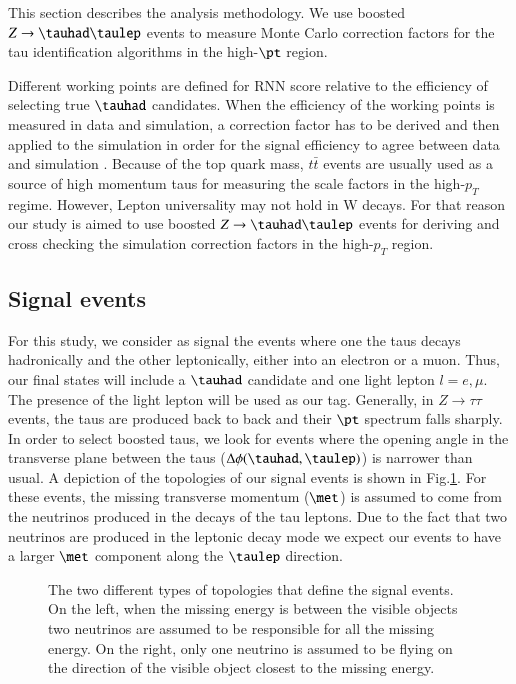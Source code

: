 This section describes the analysis methodology. We use boosted $Z\to\tauhad\taulep$ events to measure Monte Carlo correction factors for the tau identification algorithms in the high-$\pt$ region.

Different working points are defined for RNN score relative to the efficiency of selecting true $\tauhad$ candidates. When the efficiency of the working points is measured in data and simulation, a correction factor has to be derived and then applied to the simulation in order for the signal efficiency to agree between data and simulation \cite{ATLAS:2017mpa}. Because of the top quark mass, $t\bar{t}$ events are usually used as a source of high momentum taus for measuring the scale factors in the high-$p_T$ regime. However, Lepton universality may not hold in W decays. For that reason our study is aimed to use boosted $Z\to\tauhad\taulep$ events for deriving and cross checking the simulation correction factors in the high-$p_T$ region.   
\subsection{Signal events}\label{signalevents}
For this study, we consider as signal the events where one the taus decays hadronically and the other leptonically, either into an electron or a muon. Thus, our final states will include a $\tauhad$ candidate and one light lepton $l=e,\mu$. The presence of the light lepton will be used as our tag. 
Generally, in $Z\to\tau\tau$ events, the taus are produced back to back and their $\pt$ spectrum falls sharply. In order to select boosted taus, we look for events where the opening angle in the transverse plane between the taus ($\Delta\phi(\tauhad,\taulep)$) is narrower than usual. A depiction of the topologies of our signal events is shown in Fig.\ref{Fig1}. For these events, the missing transverse momentum ($\met$) is assumed to come from the neutrinos produced in the decays of the tau leptons. Due to the fact that two neutrinos are produced in the leptonic decay mode we expect our events to have a larger $\met$ component along the $\taulep$ direction.
\begin{figure}[htbp]
	\centering
	\hfill
	\caption{The two different types of topologies that define the signal events. On the left, when the missing energy is between the visible objects two neutrinos are assumed to be responsible for all the missing energy. On the right, only one neutrino is assumed to be flying on the direction of the visible object closest to the missing energy.}
	\label{Fig1}
\end{figure}

